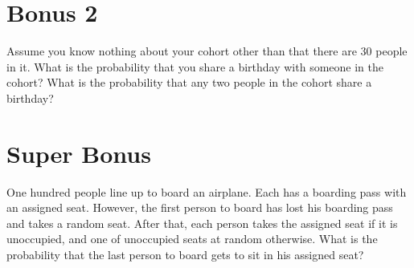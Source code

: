 \documentclass[11pt]{article}
\theoremstyle{definition}
\theoremstyle{remark}
\begin{document}
\section*{Bonus 2}
Assume you know nothing about your cohort other than that there are 30 people in it.  What is the probability that you share a birthday with someone in the cohort?  What is the probability that any two people in the cohort share a birthday?

\section*{Super Bonus}
One hundred people line up to board an airplane. Each has a boarding pass with an assigned seat. However, the first person to board has lost his boarding pass and takes a random seat. After that, each person takes the assigned seat if it is unoccupied, and one of unoccupied seats at random otherwise. What is the probability that the last person to board gets to sit in his assigned seat?
\end{document}
